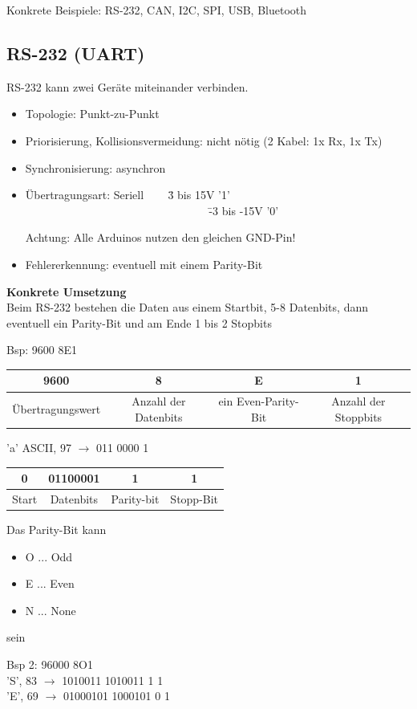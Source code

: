 Konkrete Beispiele: RS-232, CAN, I2C, SPI, USB, Bluetooth

\subsection{RS-232 (UART)}
RS-232 kann zwei Geräte miteinander verbinden.
\begin{itemize}
	\item Topologie: Punkt-zu-Punkt
	\item Priorisierung, Kollisionsvermeidung: nicht nötig (2 Kabel: 1x Rx, 1x Tx)
	\item Synchronisierung: asynchron
	\item \begin{tabbing}
		Übertragungsart: Seriell ~~~ \= 3 bis 15V '1' \\
		~~~~~~~~~~~~~~~~~~~~~~~~~~~~~~~~ \= -3 bis -15V '0'
	\end{tabbing}
	Achtung: Alle Arduinos nutzen den gleichen GND-Pin!
	\item Fehlererkennung: eventuell mit einem Parity-Bit
\end{itemize}

\textbf{Konkrete Umsetzung} \\
Beim RS-232 bestehen die Daten aus einem Startbit, 5-8 Datenbits, dann eventuell ein Parity-Bit und am Ende 1 bis 2 Stopbits

Bsp: 9600 8E1 \\
\begin{tabular}{c|c|c|c}
	9600&8&E&1 \\
	\hline
	Übertragungswert&Anzahl der Datenbits&ein Even-Parity-Bit&Anzahl der Stoppbits \\
\end{tabular}


'a' ASCII, 97 $\rightarrow$ 011 0000 1 \\
\begin{tabular}{c|c|c|c}
	0 & 01100001 & 1 & 1 \\
	\hline
	Start & Datenbits & Parity-bit & Stopp-Bit \\
\end{tabular}

Das Parity-Bit kann
\begin{itemize}
	\item O ... Odd
	\item E ... Even
	\item N ... None
\end{itemize}
sein

Bsp 2: 96000 8O1 \\
'S', 83 $\rightarrow$ 1010011  1010011 1 1 \\
'E', 69 $\rightarrow$ 01000101  1000101 0 1


